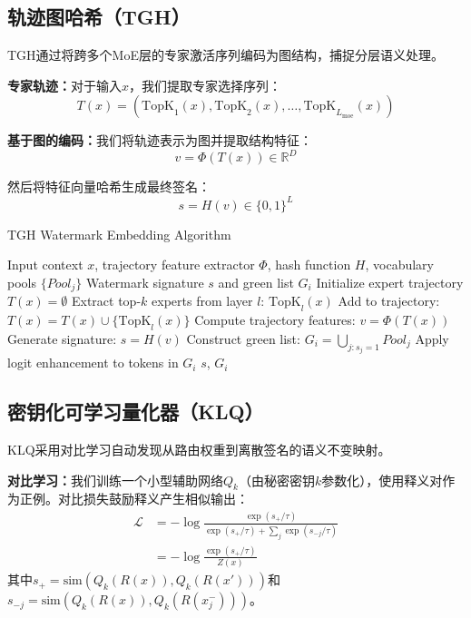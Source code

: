 \documentclass[letterpaper,twocolumn,10pt]{article}
\begin{document}
\subsection{轨迹图哈希（TGH）}

TGH通过将跨多个MoE层的专家激活序列编码为图结构，捕捉分层语义处理。

\textbf{专家轨迹：}对于输入$x$，我们提取专家选择序列：
\begin{equation}
T(x) = (\text{TopK}_1(x), \text{TopK}_2(x), \ldots, \text{TopK}_{L_{\text{moe}}}(x))
\end{equation}

\textbf{基于图的编码：}我们将轨迹表示为图并提取结构特征：
\begin{equation}
v = \Phi(T(x)) \in \mathbb{R}^D
\end{equation}

然后将特征向量哈希生成最终签名：
\begin{equation}
s = H(v) \in \{0,1\}^L
\end{equation}

\begin{algorithm}[h]
\caption{TGH Watermark Embedding Algorithm}
\begin{algorithmic}[1]
\REQUIRE Input context $x$, trajectory feature extractor $\Phi$, hash function $H$, vocabulary pools $\{Pool_j\}$
\ENSURE Watermark signature $s$ and green list $G_i$
\STATE Initialize expert trajectory $T(x) = \emptyset$ 
    \STATE Extract top-$k$ experts from layer $l$: $\text{TopK}_l(x)$ 
    \STATE Add to trajectory: $T(x) = T(x) \cup \{\text{TopK}_l(x)\}$ 
\ENDFOR
\STATE Compute trajectory features: $v = \Phi(T(x))$ 
\STATE Generate signature: $s = H(v)$ 
\STATE Construct green list: $G_i = \bigcup_{j: s_j=1} Pool_j$ 
\STATE Apply logit enhancement to tokens in $G_i$ 
\RETURN $s$, $G_i$
\end{algorithmic}
\end{algorithm}

\subsection{密钥化可学习量化器（KLQ）}

KLQ采用对比学习自动发现从路由权重到离散签名的语义不变映射。

\textbf{对比学习：}我们训练一个小型辅助网络$Q_k$（由秘密密钥$k$参数化），使用释义对作为正例。对比损失鼓励释义产生相似输出：
\begin{align}
\mathcal{L} &= -\log \frac{\exp(s_{+}/\tau)}{\exp(s_{+}/\tau) + \sum_j \exp(s_{-j}/\tau)} \nonumber \\
&= -\log \frac{\exp(s_{+}/\tau)}{Z(x)} \label{eq:contrastive_loss}
\end{align}
其中$s_{+} = \text{sim}(Q_k(R(x)), Q_k(R(x')))$和$s_{-j} = \text{sim}(Q_k(R(x)), Q_k(R(x_j^-)))$。
\end{document}
